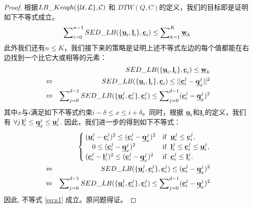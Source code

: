\begin{proof}
	根据$LB\_Keogh({\{\cal U,\cal L\},{\cal C}})$ 和 $DTW(Q,C)$的定义，我们的目标即是证明如下不等式成立。
\begin{equation}
\sum\nolimits_{i=0}^{n-1}SED\_LB(\{{\emph{{\textbf{u}}}_{i}},\emph{{\textbf{l}}}_{i} \},\emph{{\textbf{c}}}_{i}) \le \sum\nolimits_{k=1}^{K}\emph{{\textbf{w}}}_{k}
\end{equation}	
此外我们还有$n \le K$，我们接下来的策略是证明上述不等式左边的每个值都能在右边找到一个比它大或相等的元素：
\begin{eqnarray}\label{eq:s1}
&&	SED\_LB(\{{\emph{{\textbf{u}}}_{i}},\emph{{\textbf{l}}}_{i} \},\emph{{\textbf{c}}}_{i}) \le \emph{{\textbf{w}}}_{k} \nonumber\\
&\Leftrightarrow& SED\_LB(\{{\emph{{\textbf{u}}}_{i}},\emph{{\textbf{l}}}_{i} \},\emph{{\textbf{c}}}_{i}) \le    || {\emph{{\textbf{c}}}}_{i}^{j} - {\emph{{\textbf{q}}}}_{x}^{j}||^2 \nonumber\\
&\Leftrightarrow& \sum\nolimits_{j=0}^{d-1}SED\_LB(\{ \emph{{\textbf{u}}}_{i}^{j}, {\emph{{\textbf{c}}}}_{i}^{j}\},{\emph{{\textbf{c}}}}_{i}^{j}) \le \sum\nolimits_{j=0}^{d-1}({\emph{{\textbf{c}}}}_{i}^{j} - {\emph{{\textbf{q}}}}_{x}^{j})^2 
\end{eqnarray}
其中$x$与$i$满足如下不等式约束$i-\delta \le x \le i+\delta$。同时，根据 $\emph{{\textbf{u}}}_{i}$和$\emph{{\textbf{l}}}_{i}$的定义，我们有
  $\forall j  \, {\emph{{\textbf{l}}}}_{i}^{j}  \le \emph{{\textbf{q}}}_{x}^{j} \le {\emph{{\textbf{u}}}}_{i}^{j}$.
因此，我们进一步的得到如下不等式：
\begin{eqnarray}
&&\begin{cases}
({\emph{{\textbf{u}}}}_{i}^{j}- {\emph{{\textbf{c}}}}_{i}^{j})^2 \le ({\emph{{\textbf{c}}}}_{i}^{j} - {\emph{{\textbf{q}}}}_{x}^{j})^2 & {\rm if}  \,\,\,    \emph{{\textbf{u}}}_{i}^{j} \le {\emph{{\textbf{c}}}}_{i}^{j},\\
\quad 0 \le ({\emph{{\textbf{c}}}}_{i}^{j} - {\emph{{\textbf{q}}}}_{x}^{j})^2 & {\rm if}  \,\,\,   {\emph{{\textbf{l}}}}_{i}^{j} \le  {\emph{{\textbf{c}}}}_{i}^{j} \le {\emph{{\textbf{u}}}}_{i}^{j},\\
({\emph{{\textbf{c}}}}_{i}^{j} -{\emph{{\textbf{l}}}}_{i}^{j})^2 \le ({\emph{{\textbf{c}}}}_{i}^{j} - {\emph{{\textbf{q}}}}_{x}^{j})^2 & {\rm if}  \,\,\,     {\emph{{\textbf{c}}}}_{i}^{j} \le {\emph{{\textbf{l}}}}_{i}^{j}.
\end{cases} \nonumber \\
&\Leftrightarrow&SED\_LB(\{ \emph{{\textbf{u}}}_{i}^{j}, {\emph{{\textbf{c}}}}_{i}^{j}\},{\emph{{\textbf{c}}}}_{i}^{j}) \le ({\emph{{\textbf{c}}}}_{i}^{j} - {\emph{{\textbf{q}}}}_{x}^{j})^2 \nonumber \\
&\Leftrightarrow& \sum\nolimits_{j=0}^{d-1}SED\_LB(\{ \emph{{\textbf{u}}}_{i}^{j}, {\emph{{\textbf{c}}}}_{i}^{j}\},{\emph{{\textbf{c}}}}_{i}^{j}) \le \sum\nolimits_{j=0}^{d-1}({\emph{{\textbf{c}}}}_{i}^{j} - {\emph{{\textbf{q}}}}_{x}^{j})^2 \nonumber 
\end{eqnarray}
因此, 不等式 \ref{eq:s1} 成立。原问题得证。
\end{proof}

